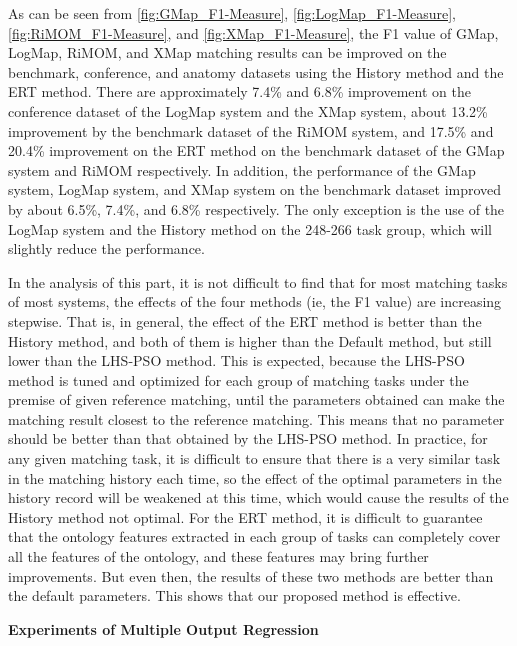 \documentclass[twoside]{article}
\begin{document}
As can be seen from \ref{fig:GMap_F1-Measure}, \ref{fig:LogMap_F1-Measure}, \ref{fig:RiMOM_F1-Measure}, and \ref{fig:XMap_F1-Measure}, the F1 value of GMap, LogMap, RiMOM, and XMap matching results can be improved on the benchmark, conference, and anatomy datasets using the History method and the ERT method. There are  approximately 7.4\% and 6.8\% improvement on the conference dataset of the LogMap system and the XMap system, about 13.2\% improvement by the benchmark dataset of the RiMOM system, and 17.5\% and 20.4\% improvement on the ERT method on the benchmark dataset of the GMap system and RiMOM respectively. In addition, the performance of the GMap system, LogMap system, and XMap system on the benchmark dataset improved by about 6.5\%, 7.4\%, and 6.8\% respectively.
The only exception is the use of the LogMap system and the History method on the 248-266 task group, which will slightly reduce the performance.

In the analysis of this part, it is not difficult to find that for most matching tasks of most systems, the effects of the four methods (ie, the F1 value) are increasing stepwise.
That is, in general, the effect of the ERT method is better than the History method, and both of them is higher than the Default method, but still lower than the LHS-PSO method.
This is expected, because the LHS-PSO method is tuned and optimized for each group of matching tasks under the premise of given reference matching, until the parameters obtained can make the matching result closest to the reference matching.
This means that no parameter should be better than that obtained by the LHS-PSO method.
In practice, for any given matching task, it is difficult to ensure that there is a very similar task in the matching history each time, so the effect of the optimal parameters in the history record will be weakened at this time, which would cause the results of the History method not optimal.
For the ERT method, it is difficult to guarantee that the ontology features extracted in each group of tasks can completely cover all the features of the ontology, and these features may bring further improvements.
But even then, the results of these two methods are better than the default parameters.
This shows that our proposed method is effective.

{\bf Experiments of Multiple Output Regression}
\end{document}
